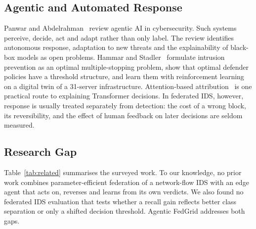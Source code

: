 \subsection{Agentic and Automated Response}
Panwar and Abdelrahman~\cite{panwar2025agentic} review agentic AI in
cybersecurity. Such systems perceive, decide, act and adapt rather than only
label. The review identifies autonomous response, adaptation to new threats
and the explainability of black-box models as open problems. Hammar and
Stadler~\cite{hammar2022} formulate intrusion prevention as an optimal
multiple-stopping problem, show that optimal defender policies have a
threshold structure, and learn them with reinforcement learning on a digital
twin of a 31-server infrastructure. Attention-based
attribution~\cite{abnar2020} is one practical route to explaining
Transformer decisions. In federated IDS, however, response is usually
treated separately from detection: the cost of a wrong block, its
reversibility, and the effect of human feedback on later decisions are
seldom measured.

\subsection{Research Gap}
Table~\ref{tab:related} summarises the surveyed work.
To our knowledge, no prior work combines parameter-efficient federation of a
network-flow IDS with an edge agent that acts on, reverses and learns from
its own verdicts. We also found no federated IDS evaluation that tests
whether a recall gain reflects better class separation or only a shifted
decision threshold. Agentic FedGrid addresses both gaps.

